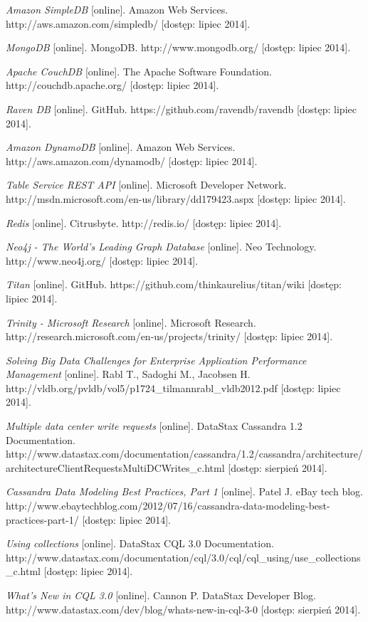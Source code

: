 \begin{thebibliography}{}
  \emph{Amazon SimpleDB} [online].
  Amazon Web Services.
  http://aws.amazon.com/simpledb/ [dostęp: lipiec 2014].
 
  \emph{MongoDB} [online].
  MongoDB.
  http://www.mongodb.org/ [dostęp: lipiec 2014].
 
  \emph{Apache CouchDB} [online].
  The Apache Software Foundation.
  http://couchdb.apache.org/ [dostęp: lipiec 2014].
 
  \emph{Raven DB} [online].
  GitHub.
  https://github.com/ravendb/ravendb [dostęp: lipiec 2014].
 
  \emph{Amazon DynamoDB} [online].
  Amazon Web Services.
  http://aws.amazon.com/dynamodb/ [dostęp: lipiec 2014].
 
  \emph{Table Service REST API} [online].
  Microsoft Developer Network.
  http://msdn.microsoft.com/en-us/library/dd179423.aspx [dostęp: lipiec 2014].
 
  \emph{Redis} [online].
  Citrusbyte.
  http://redis.io/ [dostęp: lipiec 2014].
 
  \emph{Neo4j - The World's Leading Graph Database} [online].
  Neo Technology.
  http://www.neo4j.org/ [dostęp: lipiec 2014].
 
  \emph{Titan} [online].
  GitHub.
  https://github.com/thinkaurelius/titan/wiki [dostęp: lipiec 2014].
 
  \emph{Trinity - Microsoft Research} [online].
  Microsoft Research.
  http://research.microsoft.com/en-us/projects/trinity/ [dostęp: lipiec 2014].
 
  \emph{Solving Big Data Challenges for Enterprise Application Performance Management} [online].
  Rabl T., Sadoghi M., Jacobsen H.
  http://vldb.org/pvldb/vol5/p1724\_tilmannrabl\_vldb2012.pdf [dostęp: lipiec 2014].
 
  \emph{Multiple data center write requests} [online].
  DataStax Cassandra 1.2 Documentation.
  http://www.datastax.com/documentation/cassandra/1.2/cassandra/architecture/architectureClientRequestsMultiDCWrites\_c.html [dostęp: sierpień 2014].
 
  \emph{Cassandra Data Modeling Best Practices, Part 1} [online].
  Patel J.
  eBay tech blog.
  http://www.ebaytechblog.com/2012/07/16/cassandra-data-modeling-best-practices-part-1/ [dostęp: lipiec 2014].
 
  \emph{Using collections} [online].
  DataStax CQL 3.0 Documentation.
  http://www.datastax.com/documentation/cql/3.0/cql/cql\_using/use\_collections\_c.html [dostęp: lipiec 2014].
 
  \emph{What’s New in CQL 3.0} [online].
  Cannon P.
  DataStax Developer Blog.
  http://www.datastax.com/dev/blog/whats-new-in-cql-3-0 [dostęp: sierpień 2014].
  
\end{thebibliography}
